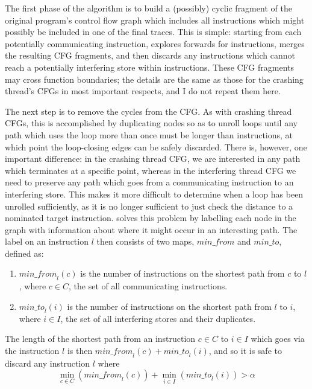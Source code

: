 The first phase of the algorithm is to build a (possibly) cyclic
fragment of the original program's control flow graph which includes
all instructions which might possibly be included in one of the final
traces.  This is simple: starting from each potentially communicating
instruction, {\technique} explores forwards for \backref{$\alpha$}
instructions, merges the resulting CFG fragments, and then discards
any instructions which cannot reach a potentially interfering store
within \backref{$\alpha$} instructions.  These CFG fragments may cross
function boundaries; the details are the same as those for the
crashing thread's CFGs in most important respects, and I do not repeat
them here.

The next step is to remove the cycles from the CFG.  As with crashing
thread CFGs, this is accomplished by duplicating nodes so as to unroll
loops until any path which uses the loop more than once must be longer
than \backref{$\alpha$} instructions, at which point the loop-closing
edges can be safely discarded.  There is, however, one important
difference: in the crashing thread CFG, we are interested in any path
which terminates at a specific point, whereas in the interfering
thread CFG we need to preserve any path which goes from a
communicating instruction to an interfering store.  This makes it more
difficult to determine when a loop has been unrolled sufficiently, as
it is no longer sufficient to just check the distance to a nominated
target instruction.  {\Technique} solves this problem by labelling
each node in the graph with information about where it might occur in
an interesting path.  The label on an instruction $l$ then consists of
two maps, $\mathit{min\_from}$ and $\mathit{min\_to}$, defined as:

\begin{enumerate}
\item
  $\mathit{min\_from}_l(c)$ is the number of instructions on the
  shortest path from $c$ to $l$, where $c \in C$, the set of all
  communicating instructions.
\item
  $\mathit{min\_to}_l(i)$ is the number of instructions on the
  shortest path from $l$ to $i$, where $i \in I$, the set of all
  interfering stores and their duplicates.
\end{enumerate}

The length of the shortest path from an instruction $c \in C$ to $i
\in I$ which goes via the instruction $l$ is then
$\mathit{min\_from}_l(c) + \mathit{min\_to}_l(i)$, and so it is safe
to discard any instruction $l$ where
\begin{displaymath}
\min_{c \in C}\left(\mathit{min\_from}_l(c)\right) + \min_{i \in I}\left(\mathit{min\_to}_l(i)\right) > \alpha
\end{displaymath}

